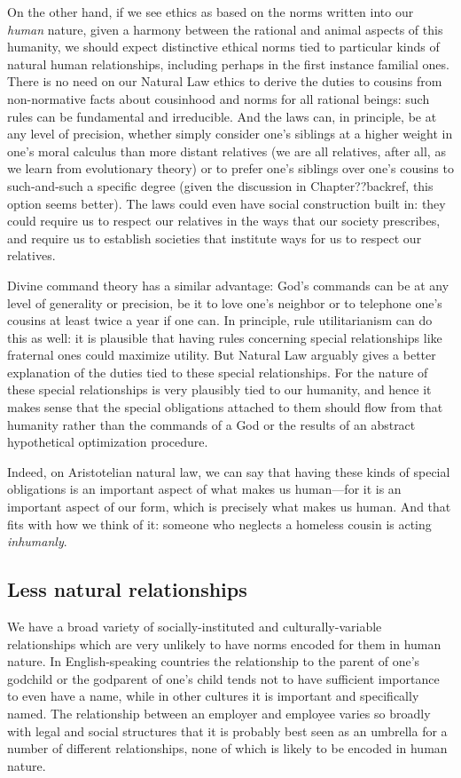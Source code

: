 On the other hand, if we see ethics as based on the norms written into our \textit{human} nature, given a harmony between the rational and animal aspects of this humanity,
we should expect distinctive ethical norms tied to particular kinds of natural human relationships, including perhaps in the first instance familial ones.
There is no need on our Natural Law ethics to derive the duties to cousins from non-normative facts about cousinhood and norms for all rational beings: such rules
can be fundamental and irreducible. And the laws can, in principle, be at any level of precision, whether simply consider one's siblings at a higher weight in one's moral calculus
than more distant relatives (we are all relatives, after all, as we learn from evolutionary theory) or to prefer one's siblings over one's cousins to such-and-such
a specific degree (given the discussion in Chapter??backref, this option seems better). The laws could even have social construction built in: they could require us to respect our relatives in the ways that our society prescribes,
and require us to establish societies that institute ways for us to respect our relatives.

Divine command theory has a similar advantage: God's commands can be at any level of generality or precision, be it to love one's neighbor or to telephone one's cousins
at least twice a year if one can. In principle, rule utilitarianism can do this as well: it is plausible that having rules concerning special relationships like
fraternal ones could maximize utility. But Natural Law arguably gives a better explanation of the duties tied to these special relationships. For the nature of these
special relationships is very plausibly tied to our humanity, and hence it makes sense that the special obligations attached to them should flow from that humanity
rather than the commands of a God or the results of an abstract hypothetical optimization procedure.

Indeed, on Aristotelian natural law, we can say that having these kinds of special obligations is an important aspect of what makes us human---for it is an important
aspect of our form, which is precisely what makes us human. And that fits with how we think of it: someone who neglects
a homeless cousin is acting \textit{inhumanly}.

\subsection{Less natural relationships}
We have a broad variety of socially-instituted and culturally-variable relationships which are very unlikely to have norms encoded
for them in human nature.  In English-speaking countries the relationship to the  parent of one's godchild or the godparent of one's child
tends not to have sufficient importance to even have a name, while in other cultures it is important and specifically named. The relationship
between an employer and employee varies so broadly with legal and social structures that it is probably best seen as an umbrella for a number
of different relationships, none of which is likely to be encoded in human nature.

